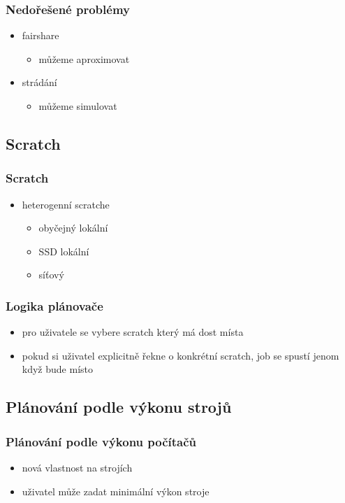 \documentclass[pdftex,aspectratio=169]{beamer}
\begin{document}
\begin{frame}
	\frametitle{Nedořešené problémy}
	\begin{itemize}
		\item{fairshare}
		\begin{itemize}
			\item{můžeme aproximovat}
		\end{itemize}
		\item{strádání}
		\begin{itemize}
			\item{můžeme simulovat}
		\end{itemize}
	\end{itemize}
\end{frame}

\subsection{Scratch}

\begin{frame}
	\frametitle{Scratch}
	\begin{itemize}
		\item{heterogenní scratche}
		\begin{itemize}
			\item{obyčejný lokální}
			\item{SSD lokální}
			\item{síťový}
		\end{itemize}
	\end{itemize}
\end{frame}

\begin{frame}
	\frametitle{Logika plánovače}
	\begin{itemize}
		\item{pro uživatele se vybere scratch který má dost místa}
		\item{pokud si uživatel explicitně řekne o konkrétní scratch, job se spustí jenom když bude místo}
	\end{itemize}
\end{frame}

\subsection{Plánování podle výkonu strojů}

\begin{frame}
	\frametitle{Plánování podle výkonu počítačů}
	\begin{itemize}
		\item{nová vlastnost na strojích}
		\item{uživatel může zadat minimální výkon stroje}
	\end{itemize}
\end{frame}
\end{document}
